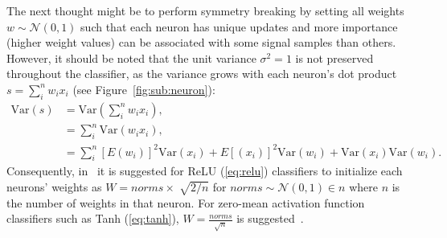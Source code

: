 The next thought might be to perform symmetry breaking by setting all weights $w\sim \mathcal{N}(0, 1)$ such that each neuron has unique updates and more importance (higher weight values) can be associated with some signal samples than others. However, it should be noted that the unit variance $\sigma^2 = 1$ is not preserved throughout the classifier, as the variance grows with each neuron's dot product $s = \sum_i^n w_i x_i$ (see Figure~\ref{fig:sub:neuron}):
\begin{subequations}
\label{eq:variance}
\begin{align}
\text{Var}(s) &= \text{Var}(\sum_i^n w_ix_i),
\\
&= \sum_i^n \text{Var}(w_ix_i),
\\
&= \sum_i^n [E(w_i)]^2\text{Var}(x_i) + E[(x_i)]^2\text{Var}(w_i) + \text{Var}(x_i)\text{Var}(w_i).
\end{align}
\end{subequations}
Consequently, in~\cite{weightinit,cs231} it is suggested for ReLU (\ref{eq:relu}) classifiers to initialize each neurons' weights as $W = norms \times \sqrt[]{2/n}$ for $norms \sim \mathcal{N}(0, 1) \in n$ where $n$ is the number of weights in that neuron. For zero-mean activation function classifiers such as Tanh (\ref{eq:tanh}), $W = \frac{norms}{\sqrt{n}}$ is suggested~\cite{cs231}.

